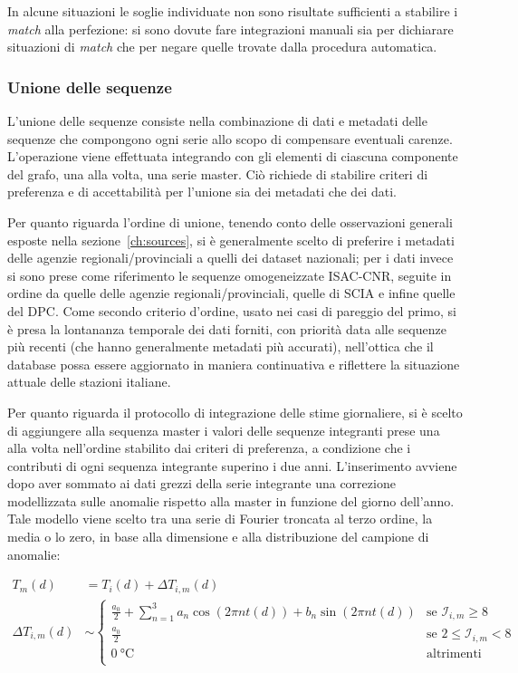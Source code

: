 In alcune situazioni le soglie individuate non sono risultate sufficienti a stabilire i \emph{match} alla perfezione: si sono dovute fare integrazioni manuali sia per dichiarare situazioni di \emph{match} che per negare quelle trovate dalla procedura automatica.

\subsubsection{Unione delle sequenze}
L'unione delle sequenze consiste nella combinazione di dati e metadati delle sequenze che compongono ogni serie allo scopo di compensare eventuali carenze. L'operazione viene effettuata integrando con gli elementi di ciascuna componente del grafo, una alla volta, una serie master. Ciò richiede di stabilire criteri di preferenza e di accettabilità per l'unione sia dei metadati che dei dati.

Per quanto riguarda l'ordine di unione, tenendo conto delle osservazioni generali esposte nella sezione~\ref{ch:sources}, si è generalmente scelto di preferire i metadati delle agenzie regionali/provinciali a quelli dei dataset nazionali; per i dati invece si sono prese come riferimento le sequenze omogeneizzate ISAC-CNR, seguite in ordine da quelle delle agenzie regionali/provinciali, quelle di SCIA e infine quelle del DPC. Come secondo criterio d'ordine, usato nei casi di pareggio del primo, si è presa la lontananza temporale dei dati forniti, con priorità data alle sequenze più recenti (che hanno generalmente metadati più accurati), nell'ottica che il database possa essere aggiornato in maniera continuativa e riflettere la situazione attuale delle stazioni italiane.

Per quanto riguarda il protocollo di integrazione delle stime giornaliere, si è scelto di aggiungere alla sequenza master i valori delle sequenze integranti prese una alla volta nell'ordine stabilito dai criteri di preferenza, a condizione che i contributi di ogni sequenza integrante superino i due anni.
L'inserimento avviene dopo aver sommato ai dati grezzi della serie integrante una correzione modellizzata sulle anomalie rispetto alla master in funzione del giorno dell'anno. Tale modello viene scelto tra una serie di Fourier troncata al terzo ordine, la media o lo zero, in base alla dimensione e alla distribuzione del campione di anomalie:

\begin{align*}
  T_m(d) &= T_i(d) + \Delta T_{i,m}(d) \\
  \Delta T_{i,m}(d) &\sim
  \begin{cases}
    \frac{a_0}{2} + \sum^3_{n=1} a_n \cos( 2\pi n t(d)) + b_n\sin(2\pi n t(d)) & \text{se } \mathcal{I}_{i,m} \ge 8 \\
    \frac{a_0}{2} & \text{se } 2 \le \mathcal{I}_{i,m} < 8 \\
    \qty{0}{\degreeCelsius} & \text{altrimenti} \\
  \end{cases}
\end{align*}

